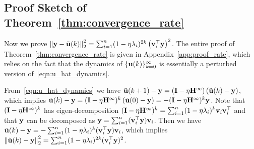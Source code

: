 



\subsection{Proof Sketch of Theorem~\ref{thm:convergence_rate}}
\label{sec:proof_sketch_rate}

Now we prove $\left\|\mathbf{y}-\tilde{\mathbf{u}}(k)\right\|_2^2 = \sum_{i=1}^{n}(1-\eta\lambda_i)^{2k} \left(\mathbf{v}_i^\top \mathbf{y}\right)^2$.
The entire proof of Theorem~\ref{thm:convergence_rate} is given in Appendix~\ref{app:proof_rate}, which relies on the fact that the dynamics of $\{\mathbf{u}(k)\}_{k=0}^\infty$ is essentially a perturbed version of~\eqref{eqn:u_hat_dynamics}.

From~\eqref{eqn:u_hat_dynamics} we have $\tilde{\mathbf{u}}(k+1) - \mathbf{y} = (\mathbf{I} - \eta \mathbf{H}^\infty) \left(\tilde{\mathbf{u}}(k)-\mathbf{y}\right)$, which implies $\tilde{\mathbf{u}}(k)-\mathbf{y} = (\mathbf{I} - \eta \mathbf{H}^\infty)^k \left(\tilde{\mathbf{u}}(0)-\mathbf{y}\right) = - (\mathbf{I} - \eta \mathbf{H}^\infty)^k \mathbf{y}$.
Note that $(\mathbf{I} - \eta \mathbf{H}^\infty)^k$ has eigen-decomposition $(\mathbf{I} - \eta \mathbf{H}^\infty)^k = \sum_{i=1}^n(1-\eta\lambda_i)^k \mathbf{v}_i \mathbf{v}_i^\top$ and that $\mathbf{y}$ can be decomposed as $\mathbf{y} = \sum_{i=1}^n (\mathbf{v}_i^\top \mathbf{y}) \mathbf{v}_i$.
Then we have $\tilde{\mathbf{u}}(k)-\mathbf{y} = - \sum_{i=1}^n(1-\eta\lambda_i)^k (\mathbf{v}_i^\top \mathbf{y}) \mathbf{v}_i$, which implies $\left\|\tilde{\mathbf{u}}(k)-\mathbf{y}\right\|_2^2 =  \sum_{i=1}^n (1-\eta\lambda_i)^{2k} (\mathbf{v}_i^\top \mathbf{y})^2$.


